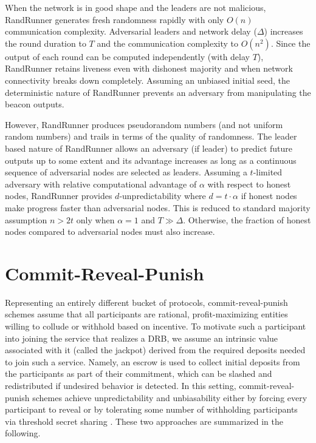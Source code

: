 \documentclass[letterpaper,twocolumn,10pt]{article}
\theoremstyle{definition}
\theoremstyle{remark}
\begin{document}
When the network is in good shape and the leaders are not malicious, RandRunner generates fresh randomness rapidly with only $O(n)$ communication complexity. Adversarial leaders and network delay ($\Delta$) increases the round duration to $T$ and the communication complexity to $O(n^2)$. Since the output of each round can be computed independently (with delay $T$), RandRunner retains liveness even with dishonest majority and when network connectivity breaks down completely. Assuming an unbiased initial seed, the deterministic nature of RandRunner prevents an adversary from manipulating the beacon outputs. 

However, RandRunner produces pseudorandom numbers (and not uniform random numbers) and trails in terms of the quality of randomness. The leader based nature of RandRunner allows an adversary (if leader) to predict future outputs up to some extent and its advantage increases as long as a continuous sequence of adversarial nodes are selected as leaders. Assuming a $t$-limited adversary with relative computational advantage of $\alpha$ with respect to honest nodes, RandRunner provides $d$-unpredictability where $d = t \cdot \alpha$ if honest nodes make progress faster than adversarial nodes. This is reduced to standard majority assumption $n > 2t$ only when $\alpha = 1$ and $T \gg \Delta$. Otherwise, the fraction of honest nodes compared to adversarial nodes must also increase.
\section{Commit-Reveal-Punish}
\label{section:commit-reveal-punish}
Representing an entirely different bucket of protocols, commit-reveal-punish schemes assume that all participants are rational, profit-maximizing entities willing to collude or withhold based on incentive. To motivate such a participant into joining the service that realizes a DRB, we assume an intrinsic value associated with it (called the jackpot) derived from the required deposits needed to join such a service. Namely, an escrow is used to collect initial deposits from the participants as part of their commitment, which can be slashed and redistributed if undesired behavior is detected. In this setting, commit-reveal-punish schemes achieve unpredictability and unbiasability either by forcing every participant to reveal \cite{youcai2017randao, andrychowicz2014secure, bentov2014use} or by tolerating some number of withholding participants via threshold secret sharing \cite{david2020economically}. These two approaches are summarized in the following.
\end{document}
